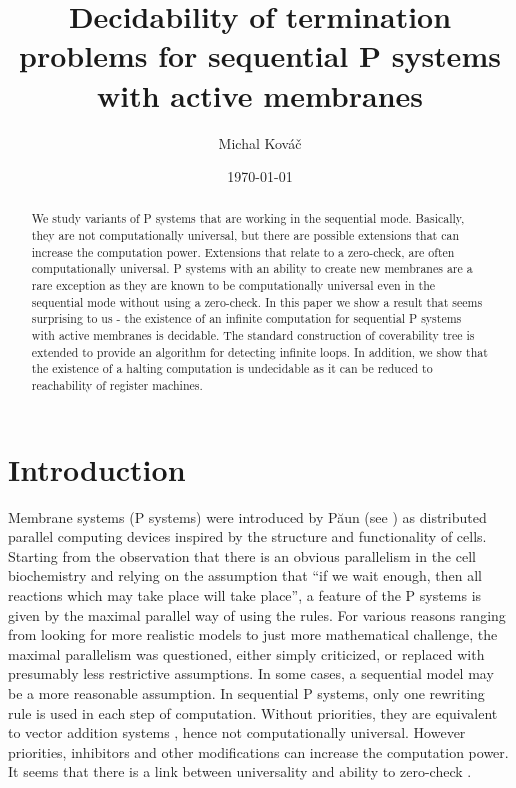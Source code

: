 \documentclass[llncs,submission,copyright,creativecommons]{../lib/lncs/llncs}
\begin{document}
\title{Decidability of termination problems for sequential P systems with active membranes}
\author{Michal Kováč}
\date{\today}
\maketitle

\begin{abstract}
We study variants of P systems that are working in the sequential mode. Basically, they are not computationally universal, but there are possible extensions that can increase the computation power. Extensions that relate to a zero-check, are often computationally universal.
P systems with an ability to create new membranes are a rare exception as they are known to be computationally universal even in the sequential mode without using a zero-check.
In this paper we show a result that seems surprising to us - the existence of an infinite computation for sequential P systems with active membranes is decidable. The standard construction of coverability tree is extended to provide an algorithm for detecting infinite loops.
In addition, we show that the existence of a halting computation is undecidable as it can be reduced to reachability of register machines.
\end{abstract}

\section{Introduction}
\label{sec:introduction}


Membrane systems (P systems) \cite{Paun10OxfordHandbookMembraneComputing} were introduced by P\u{a}un (see \cite{Paun2000108}) as distributed parallel computing devices inspired by the structure and functionality of cells. Starting from the observation that there is an obvious parallelism in the cell biochemistry and relying on the assumption that ``if we wait enough, then all reactions which may take place will take place'', a feature of the P systems is given by the maximal parallel way of using the rules. For various reasons ranging from looking for more realistic models to just more mathematical challenge, the maximal parallelism was questioned, either simply criticized, or replaced with presumably less restrictive assumptions.
In some cases, a sequential model may be a more reasonable assumption. In sequential P systems, only one rewriting rule is used in each step of computation. Without priorities, they are equivalent to vector addition systems \cite{Ibarra05Active}, hence not computationally universal. However priorities, inhibitors and other modifications can increase the computation power. It seems that there is a link between universality and ability to zero-check \cite{Alhazov12Properties}.
\end{document}
